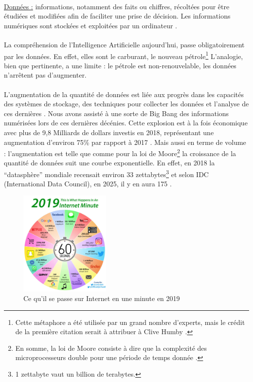\documentclass[10pt, french, a4paper]{report}
\begin{document}
\paragraph{}
\underline{Données :} informations, notamment des faits ou chiffres, récoltées pour être étudiées et modifiées afin de faciliter une prise de décision. Les informations numériques sont stockées et exploitées par un ordinateur \citep{cambridge_data_2020}.

\paragraph{}
La compréhension de l'Intelligence Artificielle aujourd'hui, passe obligatoirement par les données. En effet, elles sont le carburant, le nouveau pétrole\footnote{Cette métaphore a été utilisée par un grand nombre d'experts, mais le crédit de la première citation serait à attribuer à Clive Humby \citep{haupt_who_2006}.} L'analogie, bien que pertinente, a une limite : le pétrole est non-renouvelable, les données n'arrêtent pas d'augmenter.

\paragraph{}
L'augmentation de la quantité de données est liée aux progrès dans les capacités des systèmes de stockage, des techniques pour collecter les données et l'analyse de ces dernières \citep{press_very_2013}. Nous avons assisté à une sorte de Big Bang des informations numérisées lors de ces dernières décénies. Cette explosion est à la fois économique avec plus de 9,8 Milliards de dollars investis en 2018, représentant une augmentation d'environ 75\% par rapport à 2017 \citep{columbus_25_2019}. Mais aussi en terme de volume : l'augmentation est telle que comme pour la loi de Moore\footnote{En somme, la loi de Moore consiste à dire que la complexité des microprocesseurs double pour une période de temps donnée \citep{moore_cramming_1998}.} la croissance de la quantité de données suit une courbe exponentielle. En effet, en 2018 la ``datasphère'' mondiale recensait environ 33 zettabytes\footnote{1 zettabyte vaut un billion de terabytes.} et selon IDC (International Data Council), en 2025, il y en aura 175 \citep{reinsel_digitization_2018}.

\begin{figure}[hbt!]
  \centering
  \includegraphics[width=0.4\textwidth]{images/internet-minute-2019.jpg}
  \caption{Ce qu'il se passe sur Internet en une minute en 2019 \citep{desjardins_what_2019}}
  \label{fig:internet_minute_2019}
\end{figure}
\end{document}
